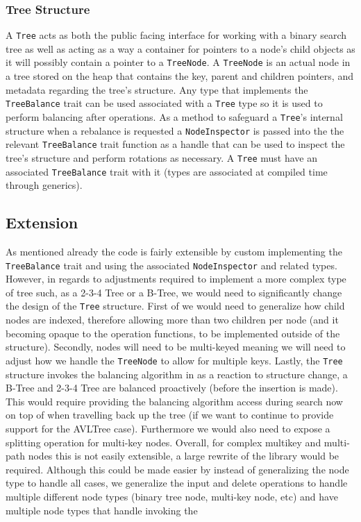 \documentclass[11pt, letterpaper]{article}
\begin{document}
\subsubsection{Tree Structure}
A \texttt{Tree} acts as both the public facing interface for working with a binary search tree as well as
acting as a way a container for pointers to a node's child objects as it will possibly contain
a pointer to a \texttt{TreeNode}.  A \texttt{TreeNode} is an actual node in a tree stored on the heap that contains the
key, parent and children pointers, and metadata regarding the tree's structure.  Any type that implements the \texttt{TreeBalance} trait
can be used associated with a \texttt{Tree} type so it is used to perform balancing after operations.
As a method to safeguard a \texttt{Tree}'s internal structure when a rebalance is requested a \texttt{NodeInspector} is passed into the
the relevant \texttt{TreeBalance} trait function as a handle that can be used to inspect the tree's structure and perform rotations as necessary.
A \texttt{Tree} must have an associated \texttt{TreeBalance} trait with it (types are associated at compiled time through generics).

\subsection{Extension}
As mentioned already the code is fairly extensible by custom implementing the \texttt{TreeBalance} trait and using the associated
\texttt{NodeInspector} and related types.  However, in regards to adjustments required to implement a more complex type of tree such, as a 2-3-4 Tree or a B-Tree,
we would need to significantly change the design of the \texttt{Tree} structure.  First of we would need to generalize how child nodes are indexed, therefore allowing
more than two children per node (and it becoming opaque to the operation functions, to be implemented outside of the structure).
Secondly, nodes will need to be multi-keyed meaning we will need to adjust how we handle the \texttt{TreeNode} to allow for multiple keys.
Lastly, the \texttt{Tree} structure invokes the balancing algorithm in as a reaction to structure change, a B-Tree and 2-3-4 Tree are balanced
proactively (before the insertion is made).  This would require providing the balancing algorithm access during search now on top of when travelling back up the tree
(if we want to continue to provide support for the AVLTree case).  Furthermore we would also need to expose a splitting operation for multi-key nodes.
Overall, for complex multikey and multi-path nodes this is not easily extensible, a large rewrite of the library would be required.
Although this could be made easier by instead of generalizing the node type to handle all cases, we generalize the input and delete operations to handle
multiple different node types (binary tree node, multi-key node, etc) and have multiple node types that handle invoking the 
\end{document}
